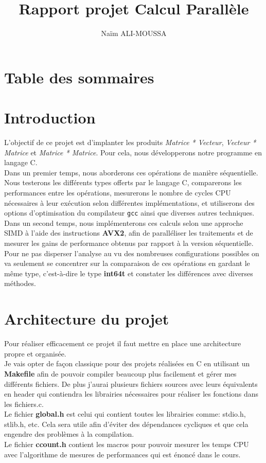 \documentclass[14pt]{article}
\title{Rapport projet Calcul Parallèle}
\author{Naïm ALI-MOUSSA}
\date{}
\begin{document}
\maketitle

\newpage

\section*{Table des sommaires}
\tableofcontents

\newpage
\section{Introduction}
L'objectif de ce projet est d'implanter les produits \textit{Matrice * Vecteur}, \textit{Vecteur * Matrice} et \textit{Matrice * Matrice}. Pour cela, nous développerons notre programme en langage C.\\
Dans un premier temps, nous aborderons ces opérations de manière séquentielle. Nous testerons les différents types offerts par le langage C, comparerons les performances entre les opérations, mesurerons le nombre de cycles CPU nécessaires à leur exécution selon différentes implémentations, et utiliserons des options d'optimisation du compilateur \texttt{gcc} ainsi que diverses autres techniques.\\
Dans un second temps, nous implémenterons ces calculs selon une approche SIMD à l'aide des instructions \textbf{AVX2}, afin de paralléliser les traitements et de mesurer les gains de performance obtenus par rapport à la version séquentielle.\\
Pour ne pas disperser l'analyse au vu des nombreuses configurations possibles on va seulement se concentrer sur la comparaison de ces opérations en gardant le même type, c'est-à-dire le type \textbf{int64t} et constater les différences avec diverses méthodes.

\newpage
\section{Architecture du projet}
Pour réaliser efficacement ce projet il faut mettre en place une architecture propre et organisée.\\
Je vais opter de façon classique pour des projets réalisées en C en utilisant un \textbf{Makefile} afin de pouvoir compiler beaucoup plus facilement et gérer mes différents fichiers. De plus j'aurai plusieurs fichiers sources avec leurs équivalents en header qui contiendra les librairies nécessaires pour réaliser les fonctions dans les fichiers.c.\\
Le fichier \textbf{global.h} est celui qui contient toutes les librairies comme: stdio.h, stlib.h, etc. Cela sera utile afin d'éviter des dépendances cycliques et que cela engendre des problèmes à la compilation.\\
Le fichier \textbf{ccount.h} contient les macros pour pouvoir mesurer les temps CPU avec l'algorithme de mesures de performances qui est énoncé dans le cours.
\end{document}
